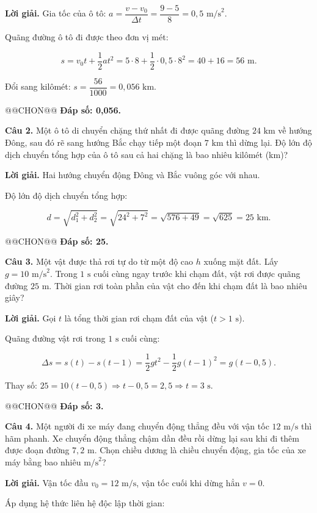 \documentclass{article}
\begin{document}
\textbf{Lời giải.} Gia tốc của ô tô: $a = \dfrac{v - v_0}{\Delta t} = \dfrac{9 - 5}{8} = 0{,}5\text{ m/s}^2$.

Quãng đường ô tô đi được theo đơn vị mét:

\[s = v_0 t + \frac{1}{2}at^2 = 5 \cdot 8 + \frac{1}{2} \cdot 0{,}5 \cdot 8^2 = 40 + 16 = 56\text{ m}.\]

Đổi sang kilômét: $s = \dfrac{56}{1000} = 0{,}056\text{ km}$.

@@CHON@@ \textbf{Đáp số: 0,056.}

\textbf{Câu 2.} Một ô tô di chuyển chặng thứ nhất đi được quãng đường $24\text{ km}$ về hướng Đông, sau đó rẽ sang hướng Bắc chạy tiếp một đoạn $7\text{ km}$ thì dừng lại. Độ lớn độ dịch chuyển tổng hợp của ô tô sau cả hai chặng là bao nhiêu kilômét (km)?

\textbf{Lời giải.} Hai hướng chuyển động Đông và Bắc vuông góc với nhau.

Độ lớn độ dịch chuyển tổng hợp:

\[d = \sqrt{d_1^2 + d_2^2} = \sqrt{24^2 + 7^2} = \sqrt{576 + 49} = \sqrt{625} = 25\text{ km}.\]

@@CHON@@ \textbf{Đáp số: 25.}

\textbf{Câu 3.} Một vật được thả rơi tự do từ một độ cao $h$ xuống mặt đất. Lấy $g = 10\text{ m/s}^2$. Trong $1\text{ s}$ cuối cùng ngay trước khi chạm đất, vật rơi được quãng đường $25\text{ m}$. Thời gian rơi toàn phần của vật cho đến khi chạm đất là bao nhiêu giây?

\textbf{Lời giải.} Gọi $t$ là tổng thời gian rơi chạm đất của vật ($t > 1\text{ s}$).

Quãng đường vật rơi trong $1\text{ s}$ cuối cùng:

\[\Delta s = s(t) - s(t - 1) = \frac{1}{2}gt^2 - \frac{1}{2}g(t - 1)^2 = g\left(t - 0{,}5\right).\]

Thay số: $25 = 10(t - 0{,}5) \Rightarrow t - 0{,}5 = 2{,}5 \Rightarrow t = 3\text{ s}$.

@@CHON@@ \textbf{Đáp số: 3.}

\textbf{Câu 4.} Một người đi xe máy đang chuyển động thẳng đều với vận tốc $12\text{ m/s}$ thì hãm phanh. Xe chuyển động thẳng chậm dần đều rồi dừng lại sau khi đi thêm được đoạn đường $7{,}2\text{ m}$. Chọn chiều dương là chiều chuyển động, gia tốc của xe máy bằng bao nhiêu $\text{m/s}^2$?

\textbf{Lời giải.} Vận tốc đầu $v_0 = 12\text{ m/s}$, vận tốc cuối khi dừng hẳn $v = 0$.

Áp dụng hệ thức liên hệ độc lập thời gian:
\end{document}
